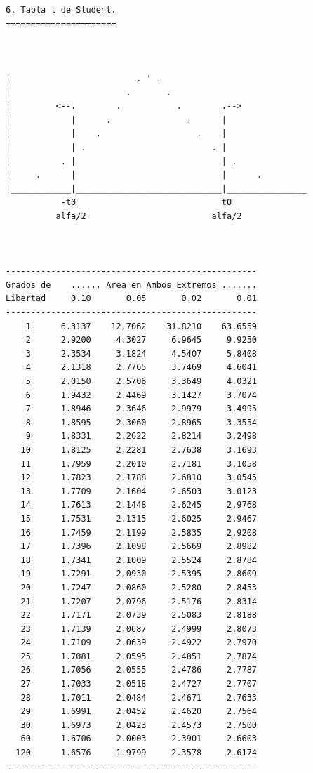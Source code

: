 \begin{verbatim}
 




6. Tabla t de Student.
======================


                          
|                         . ' .
|                       .       .
|         <--.        .           .        .-->
|            |      .               .      |
|            |    .                   .    |
|            | .                         . |
|          . |                             | .
|     .      |                             |      .
|____________|_____________________________|________________
           -t0                             t0
          alfa/2                         alfa/2



--------------------------------------------------
Grados de    ...... Area en Ambos Extremos .......
Libertad     0.10       0.05       0.02       0.01
--------------------------------------------------
    1      6.3137    12.7062    31.8210    63.6559
    2      2.9200     4.3027     6.9645     9.9250
    3      2.3534     3.1824     4.5407     5.8408
    4      2.1318     2.7765     3.7469     4.6041
    5      2.0150     2.5706     3.3649     4.0321
    6      1.9432     2.4469     3.1427     3.7074
    7      1.8946     2.3646     2.9979     3.4995
    8      1.8595     2.3060     2.8965     3.3554
    9      1.8331     2.2622     2.8214     3.2498
   10      1.8125     2.2281     2.7638     3.1693
   11      1.7959     2.2010     2.7181     3.1058
   12      1.7823     2.1788     2.6810     3.0545
   13      1.7709     2.1604     2.6503     3.0123
   14      1.7613     2.1448     2.6245     2.9768
   15      1.7531     2.1315     2.6025     2.9467
   16      1.7459     2.1199     2.5835     2.9208
   17      1.7396     2.1098     2.5669     2.8982
   18      1.7341     2.1009     2.5524     2.8784
   19      1.7291     2.0930     2.5395     2.8609
   20      1.7247     2.0860     2.5280     2.8453
   21      1.7207     2.0796     2.5176     2.8314
   22      1.7171     2.0739     2.5083     2.8188
   23      1.7139     2.0687     2.4999     2.8073
   24      1.7109     2.0639     2.4922     2.7970
   25      1.7081     2.0595     2.4851     2.7874
   26      1.7056     2.0555     2.4786     2.7787
   27      1.7033     2.0518     2.4727     2.7707
   28      1.7011     2.0484     2.4671     2.7633
   29      1.6991     2.0452     2.4620     2.7564
   30      1.6973     2.0423     2.4573     2.7500
   60      1.6706     2.0003     2.3901     2.6603
  120      1.6576     1.9799     2.3578     2.6174
--------------------------------------------------





\end{verbatim}
